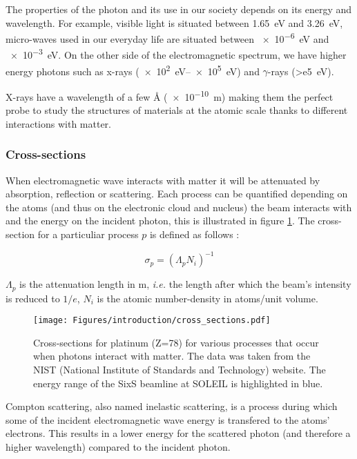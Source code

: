 The properties of the photon and its use in our society depends on its energy and wavelength.
For example, visible light is situated between \qty{1.65}{\eV} and \qty{3.26}{\eV}, micro-waves used in our everyday life are situated between \qty{e-6}{\eV} and \qty{e-3}{\eV}.
On the other side of the electromagnetic spectrum, we have higher energy photons such as x-rays (\qtyrange{e2}{e5}{\eV}) and $\gamma$-rays (\qty{>e5}{\eV}).

X-rays have a wavelength of a few \unit{\angstrom} (\qty{e-10}{\m}) making them the perfect probe to study the structures of materials at the atomic scale thanks to different interactions with matter.

\subsubsection{Cross-sections}

When electromagnetic wave interacts with matter it will be attenuated by absorption, reflection or scattering.
Each process can be quantified depending on the atoms (and thus on the electronic cloud and nucleus) the beam interacts with and the energy on the incident photon, this is illustrated in figure \ref{fig:cross_sections}.
The cross-section for a particuliar process $p$ is defined as follows \parencite{Willmott}:

\begin{equation}
	\sigma_p = (\Lambda_p N_i)^{-1}
\end{equation}

$\Lambda_p$ is the attenuation length in \unit{\meter}, \textit{i.e.} the length after which the beam's intensity is reduced to $1/e$, $N_i$ is the atomic number-density in atoms/unit volume.

\begin{figure}[!htb]
    \centering
    \texttt{[image: Figures/introduction/cross\_sections.pdf]}
    \caption{Cross-sections for platinum (Z=78) for various processes that occur when photons interact with matter. The data was taken from the NIST (National Institute of Standards and Technology) \parencite{NIST_cross_sections} website. The energy range of the SixS beamline at SOLEIL is highlighted in blue.}
    \label{fig:cross_sections}
\end{figure}

Compton scattering, also named inelastic scattering, is a process during which some of the incident electromagnetic wave energy is transfered to the atoms' electrons.
This results in a lower energy for the scattered photon (and therefore a higher wavelength) compared to the incident photon.

